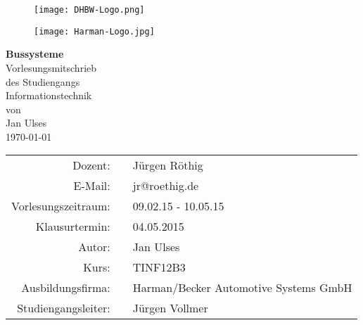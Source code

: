 \begin{titlepage}

  \onehalfspacing
  \begin{figure}[htbp]
    \begin{minipage}{0.4\textwidth}
     \centering
      \texttt{[image: DHBW-Logo.png]}
    \end{minipage}\hfill
    \begin{minipage}{0.4\textwidth}
     \centering
      \texttt{[image: Harman-Logo.jpg]}
    \end{minipage}
  \end{figure}

  \begin{center}	
	\vspace*{3cm}
    \huge \textbf{Bussysteme\\}
	\vspace*{2cm}
    \Large Vorlesungsmitschrieb\\
    \vspace*{0,75cm}
    \normalsize des Studiengangs\\
    \Large Informationstechnik\\
    \vspace*{1cm}
    \normalsize von\\
    \Large Jan Ulses\\
    \vspace*{1cm}
    \large \today\\
    \vspace*{2cm}
    \small
    \renewcommand{\arraystretch}{1,2}
    \singlespacing
    \begin{tabular}{rcl}
    	\hline
  		Dozent: & & Jürgen Röthig\\
  		E-Mail: & & jr@roethig.de\\
  		Vorlesungszeitraum: & \hspace*{0,5mm} & 09.02.15 - 10.05.15 \\
  		Klausurtermin: & & 04.05.2015\\
  		Autor: & & Jan Ulses\\
  		Kurs: & & TINF12B3\\
  		Ausbildungsfirma: & & Harman/Becker Automotive Systems GmbH\\
  		Studiengangsleiter: & & Jürgen Vollmer\\
  		\hline
 	\end{tabular}
    
  \end{center}
  \normalsize
  \vfill
  
\end{titlepage}